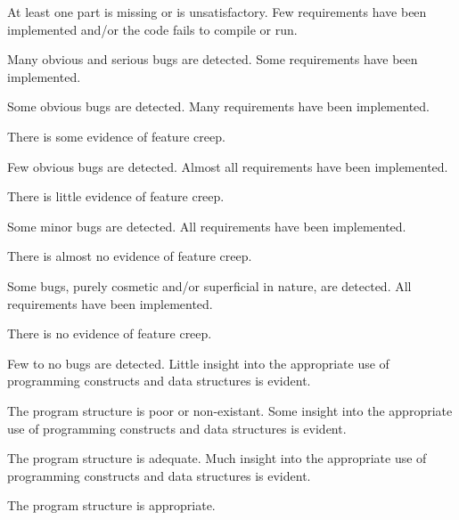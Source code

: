 \documentclass{../../fal_assignment}
\begin{document}
\rubricyeartwo
\begin{markingrubric}
		\grade\fail At least one part is missing or is unsatisfactory.
%
        \grade \fail Few requirements have been implemented  and/or the code fails to compile or run.
            \par Many obvious and serious bugs are detected.
        \grade Some requirements have been implemented.
            \par Some obvious bugs are detected.
        \grade Many requirements have been implemented.
            \par There is some evidence of feature creep.
            \par Few obvious bugs  are detected.
        \grade Almost all requirements have been implemented.
            \par There is little evidence of feature creep.
            \par Some minor bugs  are detected.
        \grade All requirements have been implemented.
            \par There is almost no evidence of feature creep.
            \par Some bugs, purely cosmetic and/or superficial in nature, are detected.
        \grade All requirements have been implemented.
            \par There is no evidence of feature creep.
            \par Few to no bugs are detected.
%
        \grade \fail Little insight into the appropriate use of programming constructs and data structures is evident.
            \par The program structure is poor or non-existant.
        \grade Some insight into the appropriate use of programming constructs and data structures is evident.
            \par The program structure is adequate.
        \grade Much insight into the appropriate use of programming constructs and data structures is evident.
            \par The program structure is appropriate.

\end{markingrubric}
\end{document}
